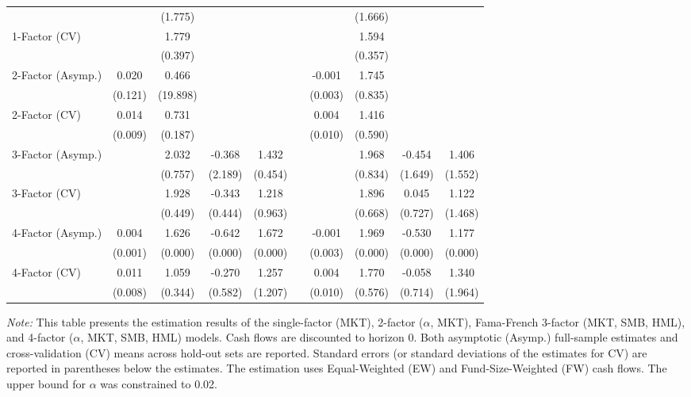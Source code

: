 \begin{table}[H]
{\begin{tabular}{l cccc c cccc}
			&  & (1.775) &  &  &  &  & (1.666) &  &  \\
			1-Factor (CV) &  & 1.779 &  &  &  &  & 1.594 &  &  \\
			&  & (0.397) &  &  &  &  & (0.357) &  &  \\
			2-Factor (Asymp.) & 0.020 & 0.466 &  &  &  & -0.001 & 1.745 &  &  \\
			& (0.121) & (19.898) &  &  &  & (0.003) & (0.835) &  &  \\
			2-Factor (CV) & 0.014 & 0.731 &  &  &  & 0.004 & 1.416 &  &  \\
			& (0.009) & (0.187) &  &  &  & (0.010) & (0.590) &  &  \\
			3-Factor (Asymp.) &  & 2.032 & -0.368 & 1.432 &  &  & 1.968 & -0.454 & 1.406 \\
			&  & (0.757) & (2.189) & (0.454) &  &  & (0.834) & (1.649) & (1.552) \\
			3-Factor (CV) &  & 1.928 & -0.343 & 1.218 &  &  & 1.896 & 0.045 & 1.122 \\
			&  & (0.449) & (0.444) & (0.963) &  &  & (0.668) & (0.727) & (1.468) \\
			4-Factor (Asymp.) & 0.004 & 1.626 & -0.642 & 1.672 &  & -0.001 & 1.969 & -0.530 & 1.177 \\
			& (0.001) & (0.000) & (0.000) & (0.000) &  & (0.003) & (0.000) & (0.000) & (0.000) \\
			4-Factor (CV) & 0.011 & 1.059 & -0.270 & 1.257 &  & 0.004 & 1.770 & -0.058 & 1.340 \\
			& (0.008) & (0.344) & (0.582) & (1.207) &  & (0.010) & (0.576) & (0.714) & (1.964) \\
			\hline
		\end{tabular}
	}
	\par
	\vspace{1ex}
	\raggedright \footnotesize \textit{Note:} This table presents the estimation results of the single-factor (MKT), 2-factor ($\alpha$, MKT), Fama-French 3-factor (MKT, SMB, HML), and 4-factor ($\alpha$, MKT, SMB, HML) models. Cash flows are discounted to horizon 0. Both asymptotic (Asymp.) full-sample estimates and cross-validation (CV) means across hold-out sets are reported. Standard errors (or standard deviations of the estimates for CV) are reported in parentheses below the estimates. The estimation uses Equal-Weighted (EW) and Fund-Size-Weighted (FW) cash flows. The upper bound for $\alpha$ was constrained to 0.02.
\end{table}

